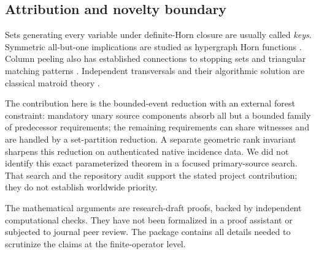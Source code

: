 \subsection{Attribution and novelty boundary}

Sets generating every variable under definite-Horn closure are usually
called \emph{keys}. Symmetric all-but-one implications are studied as
hypergraph Horn functions \cite{horn-keys,hypergraph-horn}. Column peeling
also has established connections to stopping sets and triangular matching
patterns \cite{stopping-sets,uniquely-restricted}. Independent transversals
and their algorithmic solution are classical matroid theory
\cite{rado,edmonds}.

The contribution here is the bounded-event reduction with an external
forest constraint: mandatory unary source components absorb all but a
bounded family of predecessor requirements; the remaining requirements can
share witnesses and are handled by a set-partition reduction. A separate
geometric rank invariant sharpens this reduction on authenticated native
incidence data. We did not identify this exact parameterized theorem in a
focused primary-source search. That search and the repository audit support
the stated project contribution; they do not establish worldwide priority.

The mathematical arguments are research-draft proofs, backed by independent
computational checks. They have not been formalized in a proof assistant or
subjected to journal peer review. The package contains all details needed
to scrutinize the claims at the finite-operator level.
